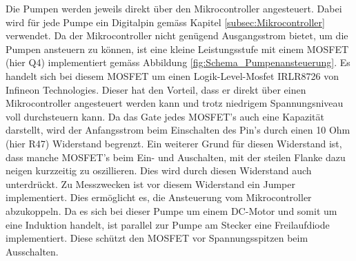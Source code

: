 Die Pumpen werden jeweils direkt über den Mikrocontroller angesteuert. Dabei wird für jede Pumpe ein Digitalpin gemäss Kapitel \ref{subsec:Mikrocontroller} verwendet. Da der Mikrocontroller nicht genügend Ausgangsstrom bietet, um die Pumpen ansteuern zu können, ist eine kleine Leistungsstufe mit einem MOSFET (hier Q4) implementiert gemäss Abbildung \ref{fig:Schema_Pumpenansteuerung}. Es handelt sich bei diesem MOSFET um einen Logik-Level-Mosfet IRLR8726 von Infineon Technologies. Dieser hat den Vorteil, dass er direkt über einen Mikrocontroller angesteuert werden kann und trotz niedrigem Spannungsniveau voll durchsteuern kann. Da das Gate jedes MOSFET's auch eine Kapazität darstellt, wird der Anfangsstrom beim Einschalten des Pin's durch einen 10 Ohm (hier R47) Widerstand begrenzt. Ein weiterer Grund für diesen Widerstand ist, dass manche MOSFET's beim Ein- und Auschalten, mit der steilen Flanke dazu neigen kurzzeitig zu oszillieren. Dies wird durch diesen Widerstand auch unterdrückt. Zu Messzwecken ist vor diesem Widerstand ein Jumper implementiert. Dies ermöglicht es, die Ansteuerung vom Mikrocontroller abzukoppeln. Da es sich bei dieser Pumpe um einem DC-Motor und somit um eine Induktion handelt, ist parallel zur Pumpe am Stecker eine Freilaufdiode implementiert. Diese schützt den MOSFET vor Spannungsspitzen beim Ausschalten. \cite[S.362]{atmel_atmel_2014}  \cite{mouser_mp24943dn-lf_nodate}